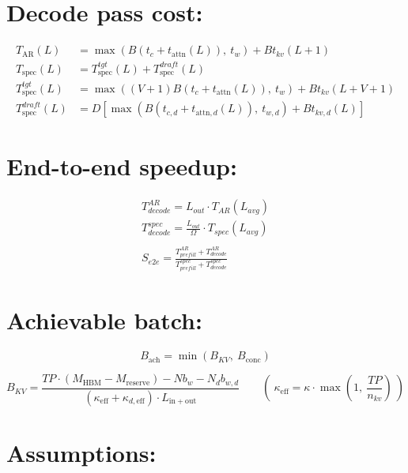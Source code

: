 \documentclass[11pt]{article}
\begin{document}
\section*{Decode pass cost:}

\begin{align*}
T_{\mathrm{AR}}(L) &= \max\left(B (t_c + t_{\mathrm{attn}}(L)),\ t_w\right) + B t_{kv}(L+1) \tag{no KV overlap when compute bound} \\[6pt]
T_{\mathrm{spec}}(L) &= T_{\mathrm{spec}}^{tgt}(L) + T_{\mathrm{spec}}^{draft}(L) \\[6pt]
T_{\mathrm{spec}}^{tgt}(L) &= \max\left((V+1) B (t_c + t_{\mathrm{attn}}(L)),\ t_w\right) + B t_{kv}(L+V+1) \\[6pt]
T_{\mathrm{spec}}^{draft}(L) &= D\left[\max\left(B (t_{c,d} + t_{\mathrm{attn},d}(L)),\ t_{w,d}\right) + B t_{kv,d}(L)\right]
\end{align*}
\section*{End-to-end speedup:}

\begin{align*}
T_{decode}^{AR} = L_{out} \cdot T_{AR}(L_{avg}) \\
T_{decode}^{spec} = \frac{L_{out}}\Omega \cdot T_{spec}(L_{avg}) \\\\
S_{e2e} = \frac{T_{prefill}^{AR} + T_{decode}^{AR}}{T_{prefill}^{spec} + T_{decode}^{spec}}
\end{align*}

\section*{Achievable batch:}

\begin{equation*}
B_{\mathrm{ach}} = \min\left(B_{KV},\ B_{\mathrm{conc}}\right)
\end{equation*}

\begin{equation*}
B_{KV} = \frac{TP \cdot \left(M_{\mathrm{HBM}} - M_{\mathrm{reserve}}\right) - N b_w - N_d b_{w,d}}
              {\left(\kappa_{\mathrm{eff}} + \kappa_{d,\mathrm{eff}}\right) \cdot L_{\mathrm{in + out}}}
\qquad
\left(\ \kappa_{\mathrm{eff}} = \kappa \cdot \max\!\left(1,\ \frac{TP}{n_{kv}}\right)\ \right)
\end{equation*}

\section*{Assumptions:}
\end{document}

